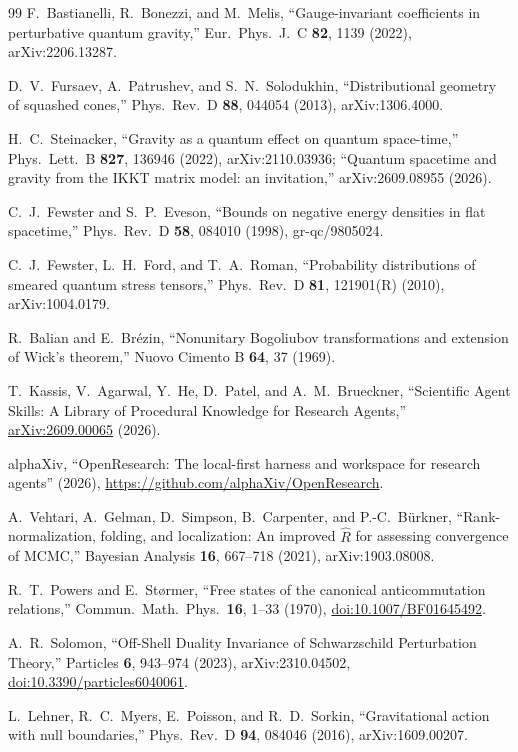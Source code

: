 \documentclass[onecolumn,11pt,aps,prd,amsmath,amssymb,nofootinbib,floatfix]{revtex4-2}
\begin{document}
\begin{thebibliography}{99}
F.~Bastianelli, R.~Bonezzi, and M.~Melis, ``Gauge-invariant coefficients in perturbative quantum gravity,'' Eur.\ Phys.\ J.\ C \textbf{82}, 1139 (2022), arXiv:2206.13287.

D.~V.~Fursaev, A.~Patrushev, and S.~N.~Solodukhin, ``Distributional geometry of squashed cones,'' Phys.\ Rev.\ D \textbf{88}, 044054 (2013), arXiv:1306.4000.

H.~C.~Steinacker, ``Gravity as a quantum effect on quantum space-time,'' Phys.\ Lett.\ B \textbf{827}, 136946 (2022), arXiv:2110.03936; ``Quantum spacetime and gravity from the IKKT matrix model: an invitation,'' arXiv:2609.08955 (2026).

C.~J.~Fewster and S.~P.~Eveson, ``Bounds on negative energy densities in flat spacetime,'' Phys.\ Rev.\ D \textbf{58}, 084010 (1998), gr-qc/9805024.

C.~J.~Fewster, L.~H.~Ford, and T.~A.~Roman, ``Probability distributions of smeared quantum stress tensors,'' Phys.\ Rev.\ D \textbf{81}, 121901(R) (2010), arXiv:1004.0179.

R.~Balian and E.~Br\'ezin, ``Nonunitary Bogoliubov transformations and extension of Wick's theorem,'' Nuovo Cimento B \textbf{64}, 37 (1969).

T.~Kassis, V.~Agarwal, Y.~He, D.~Patel, and A.~M.~Brueckner, ``Scientific Agent Skills: A Library of Procedural Knowledge for Research Agents,'' \href{https://doi.org/10.48550/arXiv.2609.00065}{arXiv:2609.00065} (2026).

alphaXiv, ``OpenResearch: The local-first harness and workspace for research agents'' (2026), \url{https://github.com/alphaXiv/OpenResearch}.

A.~Vehtari, A.~Gelman, D.~Simpson, B.~Carpenter, and P.-C.~B\"urkner, ``Rank-normalization, folding, and localization: An improved $\widehat R$ for assessing convergence of MCMC,'' Bayesian Analysis \textbf{16}, 667--718 (2021), arXiv:1903.08008.

R.~T.~Powers and E.~St\o rmer, ``Free states of the canonical anticommutation relations,'' Commun.\ Math.\ Phys.\ \textbf{16}, 1--33 (1970), \href{https://doi.org/10.1007/BF01645492}{doi:10.1007/BF01645492}.

A.~R.~Solomon, ``Off-Shell Duality Invariance of Schwarzschild Perturbation Theory,'' Particles \textbf{6}, 943--974 (2023), arXiv:2310.04502, \href{https://doi.org/10.3390/particles6040061}{doi:10.3390/particles6040061}.

L.~Lehner, R.~C.~Myers, E.~Poisson, and R.~D.~Sorkin, ``Gravitational action with null boundaries,'' Phys.\ Rev.\ D \textbf{94}, 084046 (2016), arXiv:1609.00207.

\end{thebibliography}
\end{document}
